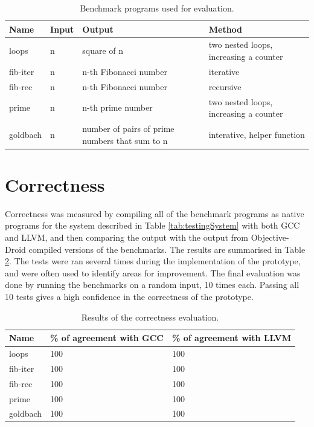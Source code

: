 \documentclass[parskip]{cs4rep}
\begin{document}
\begin{table}
    \centering
    \begin{tabular}{ | l | l | p{4cm} | p{4cm} |}
    \hline
    Name & Input & Output & Method\\ \hline
    loops & n & square of n & two nested loops, increasing a counter \\ \hline
    fib-iter & n & n-th Fibonacci number & iterative \\ \hline
    fib-rec & n & n-th Fibonacci number & recursive \\ \hline
    prime & n & n-th prime number & two nested loops, increasing a counter \\ \hline
    goldbach & n & number of pairs of prime numbers that sum to n & interative, helper function \\ \hline
    \end{tabular}
    \caption{Benchmark programs used for evaluation.}
    \label{tab:benchmarks}
\end{table}

\section{Correctness}

Correctness was measured by compiling all of the benchmark programs as native programs for the system described in Table \ref{tab:testingSystem} with both GCC and LLVM, and then comparing the output with the output from Objective-Droid compiled versions of the benchmarks. The results are summarised in Table \ref{tab:correctness}. The tests were ran several times during the implementation of the prototype, and were often used to identify areas for improvement. The final evaluation was done by running the benchmarks on a random input, 10 times each. Passing all 10 tests gives a high confidence in the correctness of the prototype.

\begin{table}
    \centering
    \begin{tabular}{ | l | p{2.8cm} | p{2.8cm} |}
    \hline
    Name & \% of agreement with GCC & \% of agreement with LLVM \\ \hline
    loops & 100 & 100 \\ \hline
    fib-iter & 100 & 100 \\ \hline
    fib-rec & 100 & 100 \\ \hline
    prime & 100 & 100 \\ \hline
    goldbach & 100 & 100 \\ \hline
    \end{tabular}
    \caption{Results of the correctness evaluation.}
    \label{tab:correctness}
\end{table}
\end{document}
